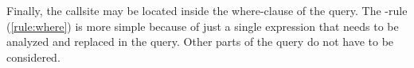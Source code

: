 \iffalse
\begin{figure}[h!]
    \centering\footnotesize
  \makebox[\textwidth][c]{
$$\inferrule{
    \exists i \in \{1, ..., n\}: \hasCallsite(T, e_{f_i}) \\
    \neg \hasCallsite(T, ts)\\
    \neg \hasCallsite(T, w) \\\\
    \forall i \in \{1, ..., n\}: T, \varnothing \vdash (\TRUE, t_i) \rightarrow (B_i, R_i)
}{
T, \varnothing \vdash (p, \SELECT~ ts ~\FROM~ t_1 \AS a_1 \otimes ... \otimes  t_n \AS a_n ~\WHERE~ w) \rightarrow \\\\
{\begin{tabular}[b]{LLLL}
         \Big( \big\{ (\SELECT~ p ~\AND~ p_1 ~\AND~ \cdots ~\AND~ p_n,~ \SELECT~ ts ~\FROM~ t'_1 \AS a_1 \otimes ... \otimes  t'_n \AS a_n ~\WHERE~ w ~~)\\
\phantom{\Big( \big\{}| ~((p_1, t'_1), ..., (p_n, t'_n)) \in \times_{\{i|1\leq i \leq n\}} B_i \hspace*{80mm}\big\}, \\
\phantom{\Big(}\big\{ (\SELECT~ p ~\AND~ p_1 ~\AND~ \cdots ~\AND~ p_n,~ \SELECT~ ts ~\FROM~ t'_1 \AS a_1 \otimes ... \otimes  t'_n \AS a_n ~\WHERE~ w ~~)\\
\phantom{\Big( \big\{}| ~ ((p_1, t'_1), ..., (p_n, t'_n)) \in \times_{\{i|1\leq i \leq n\}} (B_i \cup R_i), \exists t' \in \{t'_1, ..., t'_n\} : \hasCallsite(t') \hspace*{17mm}\big\}\Big)\\
\end{tabular}}
}
\quad(\textsc{from})
$$
}
    \caption{\RFROM-rule}
    \label{rule:from}
\end{figure}
\fi

Finally, the callsite may be located inside the where-clause of the query. The \RWHERE-rule (\autoref{rule:where}) is more simple because of just a single expression that needs to be analyzed and replaced in the query. Other parts of the query do not have to be considered.


